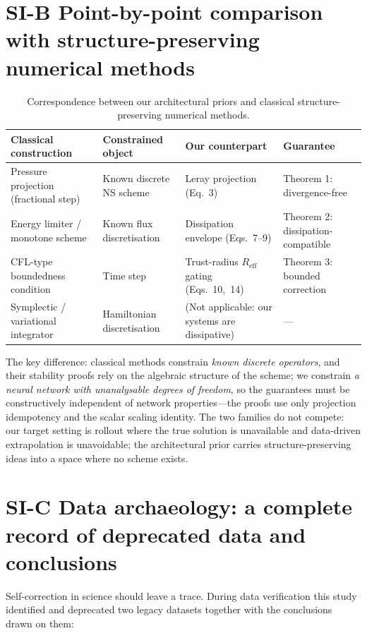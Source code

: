 \documentclass[11pt,a4paper]{article}
\begin{document}
\section*{SI-B \quad Point-by-point comparison with structure-preserving numerical methods}

\begin{table}[htbp]
\centering\small
\caption{Correspondence between our architectural priors and classical structure-preserving numerical methods.}
\begin{tabular}{llll}
\toprule
Classical construction & Constrained object & Our counterpart & Guarantee \\
\midrule
Pressure projection (fractional step) & Known discrete NS scheme & Leray projection (Eq.~3) & Theorem 1: divergence-free \\
Energy limiter / monotone scheme & Known flux discretisation & Dissipation envelope (Eqs.~7--9) & Theorem 2: dissipation-compatible \\
CFL-type boundedness condition & Time step & Trust-radius $R_{\mathrm{eff}}$ gating (Eqs.~10,~14) & Theorem 3: bounded correction \\
Symplectic / variational integrator & Hamiltonian discretisation & (Not applicable: our systems are dissipative) & --- \\
\bottomrule
\end{tabular}
\end{table}

The key difference: classical methods constrain \emph{known discrete operators}, and their stability proofs rely on the algebraic structure of the scheme; we constrain \emph{a neural network with unanalysable degrees of freedom}, so the guarantees must be constructively independent of network properties---the proofs use only projection idempotency and the scalar scaling identity. The two families do not compete: our target setting is rollout where the true solution is unavailable and data-driven extrapolation is unavoidable; the architectural prior carries structure-preserving ideas into a space where no scheme exists.

\section*{SI-C \quad Data archaeology: a complete record of deprecated data and conclusions}

Self-correction in science should leave a trace. During data verification this study identified and deprecated two legacy datasets together with the conclusions drawn on them:
\end{document}
